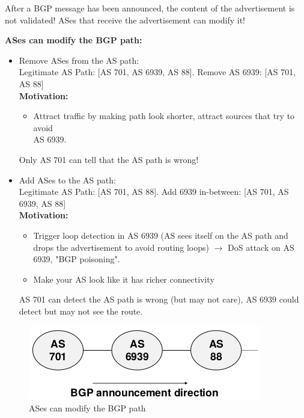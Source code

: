 \documentclass[11pt,oneside,a4paper]{article}
\begin{document}
After a BGP message has been announced, the content of the advertisement is not validated! ASes that receive the advertisement can modify it!

\noindent \textbf{ASes can modify the BGP path:}

\vspace{-\topsep}
\begin{itemize}
	\setlength{\itemsep}{0pt}
	\setlength{\parskip}{0pt}
	\item Remove ASes from the AS path:\\
	Legitimate AS Path: [AS 701, AS 6939, AS 88]. Remove AS 6939: [AS 701, AS 88]\\
	\textbf{Motivation:}
	\vspace{-\topsep}
	\begin{itemize}
		\item 	Attract traffic by making path look shorter, attract sources that try to avoid\\
		AS 6939.
	\end{itemize}
	Only AS 701 can tell that the AS path is wrong!
	\item Add ASes to the AS path:\\
	Legitimate AS Path: [AS 701, AS 88]. Add 6939 in-between: [AS 701, AS 6939, AS 88]\\
	\textbf{Motivation:}
	\vspace{-\topsep}
	\begin{itemize} 
		\item Trigger loop detection in AS 6939 (AS sees itself on the AS path and drops the advertisement to avoid routing loops) $\rightarrow$ DoS attack on AS 6939, "BGP poisoning".
		\item Make your AS look like it has richer connectivity
	\end{itemize}
	AS 701 can detect the AS path is wrong (but may not care), AS 6939 could detect but may not see the route.
\end{itemize}
\vspace{-\topsep}

\begin{figure}
	\centering
	\includegraphics[width=0.4\linewidth]{figures/bgp_as_path}
	\caption{ASes can modify the BGP path}
	\label{fig:bgpaspath}
\end{figure}
\end{document}
